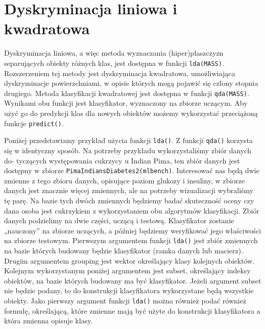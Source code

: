 \documentclass[polish,]{book}
\begin{document}
\hypertarget{part_41}{%
\section{Dyskryminacja liniowa i kwadratowa}\label{part_41}}

Dyskryminacja liniowa, a więc metoda wyznaczania (hiper)płaszczyzn separujących
obiekty różnych klas, jest dostępna w funkcji \texttt{lda(MASS)}. Rozszerzeniem tej metody jest dyskryminacja kwadratowa, umożliwiająca dyskryminacje powierzchniami,
w opisie których mogą pojawić się człony stopnia drugiego. Metoda klasyfikacji kwadratowej jest dostępna w funkcji \texttt{qda(MASS)}. Wynikami obu funkcji jest klasyfikator,
wyznaczony na zbiorze uczącym. Aby użyć go do predykcji klas dla nowych obiektów
możemy wykorzystać przeciążoną funkcje \texttt{predict()}.

Poniżej przedstawiamy przykład użycia funkcji \texttt{lda()}. Z funkcji \texttt{qda()} korzysta
się w identyczny sposób. Na potrzeby przykładu wykorzystaliśmy zbiór danych do-
tyczących występowania cukrzycy u Indian Pima, ten zbiór danych jest dostępny
w zbiorze \texttt{PimaIndiansDiabetes2(mlbench)}. Interesować nas będą dwie zmienne
z tego zbioru danych, opisujące poziom glukozy i insuliny, w zbiorze danych jest
znacznie więcej zmiennych, ale na potrzeby wizualizacji wybraliśmy tę parę. Na bazie tych dwóch zmiennych będziemy badać skuteczność oceny czy dana osoba jest
cukrzykiem z wykorzystaniem obu algorytmów klasyfikacji. Zbiór danych podzielimy na dwie części, uczącą i testową. Klasyfikator zostanie „nauczony'' na zbiorze
uczących, a później będziemy weryfikować jego właściwości na zbiorze testowym.
Pierwszym argumentem funkcji \texttt{lda()} jest zbiór zmiennych na bazie których
budowany będzie klasyfikator (ramka danych lub macierz). Drugim argumentem
grouping jest wektor określający klasy kolejnych obiektów. Kolejnym wykorzystanym poniżej argumentem jest subset, określający indeksy obiektów, na bazie których budowany ma być klasyfikator. Jeżeli argument subset nie będzie podany, to
do konstrukcji klasyfikatora wykorzystane będą wszystkie obiekty. Jako pierwszy
argument funkcji \texttt{lda()} można również podać również formułę, określającą, które
zmienne mają być użyte do konstrukcji klasyfikatora a która zmienna opisuje klasy.
\end{document}
